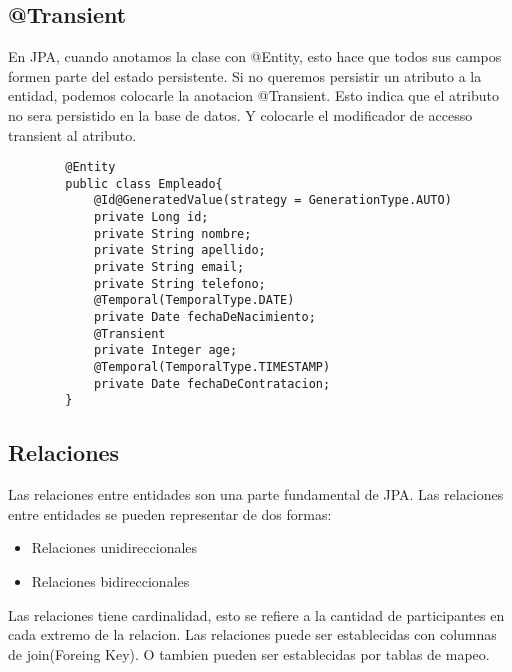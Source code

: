 \documentclass{article}
\begin{document}
\subsection*{@Transient}
En JPA, cuando anotamos la clase con @Entity, esto hace que todos sus campos formen parte del estado persistente. Si no queremos persistir un atributo a la entidad,
podemos colocarle la anotacion @Transient. Esto indica que el atributo no sera persistido en la base de datos. Y colocarle el modificador de accesso transient al atributo.
\begin{lstlisting}
        @Entity
        public class Empleado{
            @Id@GeneratedValue(strategy = GenerationType.AUTO)
            private Long id;
            private String nombre;
            private String apellido;
            private String email;
            private String telefono;
            @Temporal(TemporalType.DATE)
            private Date fechaDeNacimiento;
            @Transient
            private Integer age;
            @Temporal(TemporalType.TIMESTAMP)
            private Date fechaDeContratacion;
        }
    \end{lstlisting}

\subsection*{Relaciones}
Las relaciones entre entidades son una parte fundamental de JPA. Las relaciones entre entidades se pueden representar de dos formas:
\begin{itemize}
	\item Relaciones unidireccionales
	\item Relaciones bidireccionales
\end{itemize}

Las relaciones tiene cardinalidad, esto se refiere a la cantidad de participantes en cada extremo de la relacion. Las relaciones puede
ser establecidas con columnas de join(Foreing Key). O tambien pueden ser establecidas por tablas de mapeo.
\end{document}
